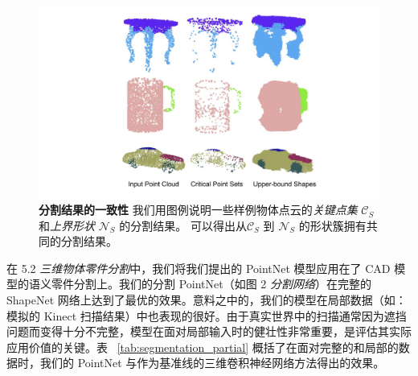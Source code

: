 
\begin{figure}[t!]
\centering
\includegraphics[width=0.9\linewidth]{fig/seg_robust.pdf}
\caption{\textbf{分割结果的一致性} 我们用图例说明一些样例物体点云的\textit{关键点集} $\mathcal{C}_S$和\textit{上界形状} $\mathcal{N}_S$ 的分割结果。 可以得出从$\mathcal{C}_S$ 到 $\mathcal{N}_S$ 的形状簇拥有共同的分割结果。}
\label{fig:seg_robust}
\end{figure}


在 5.2 \textit{三维物体零件分割}中，我们将我们提出的 PointNet 模型应用在了 CAD 模型的语义零件分割上。我们的分割 PointNet（如图 2 \textit{分割网络}）在完整的 ShapeNet 网络上达到了最优的效果。意料之中的，我们的模型在局部数据（如：模拟的 Kinect 扫描结果）中也表现的很好。由于真实世界中的扫描通常因为遮挡问题而变得十分不完整，模型在面对局部输入时的健壮性非常重要，是评估其实际应用价值的关键。表 ~\ref{tab:segmentation_partial} 概括了在面对完整的和局部的数据时，我们的 PointNet 与作为基准线的三维卷积神经网络方法得出的效果。



